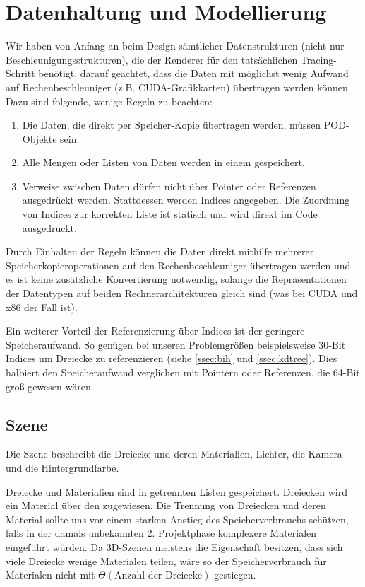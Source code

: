 \section{Datenhaltung und Modellierung}

Wir haben von Anfang an beim Design sämtlicher Datenstrukturen (nicht nur Beschleunigungsstrukturen), die der Renderer für den tatsächlichen Tracing-Schritt benötigt, darauf geachtet, dass die Daten mit möglichst wenig Aufwand auf Rechenbeschleuniger (z.B. CUDA-Grafikkarten) übertragen werden können. Dazu sind folgende, wenige Regeln zu beachten:

\begin{enumerate}
\item Die Daten, die direkt per Speicher-Kopie übertragen werden, müssen POD-Objekte sein.
\item Alle Mengen oder Listen von Daten werden in einem  gespeichert.
\item Verweise zwischen Daten dürfen nicht über Pointer oder Referenzen ausgedrückt werden. Stattdessen werden Indices angegeben. Die Zuordnung von Indices zur korrekten Liste ist statisch und wird direkt im Code ausgedrückt.
\end{enumerate}

Durch Einhalten der Regeln können die Daten direkt mithilfe mehrerer Speicherkopieroperationen auf den Rechenbeschleuniger übertragen werden und es ist keine zusätzliche Konvertierung notwendig, solange die Repräsentationen der Datentypen auf beiden Rechnerarchitekturen gleich sind (was bei CUDA und x86 der Fall ist).

Ein weiterer Vorteil der Referenzierung über Indices ist der geringere Speicheraufwand. So genügen bei unseren Problemgrößen beispielsweise 30-Bit Indices um Dreiecke zu referenzieren (siehe \ref{ssec:bih} und \ref{ssec:kdtree}). Dies halbiert den Speicheraufwand verglichen mit Pointern oder Referenzen, die 64-Bit groß gewesen wären.

\subsection{Szene}

Die Szene beschreibt die Dreiecke und deren Materialien, Lichter, die Kamera und die Hintergrundfarbe.

Dreiecke und Materialien sind in getrennten Listen gespeichert. Dreiecken wird ein Material über den  zugewiesen. Die Trennung von Dreiecken und deren Material sollte uns vor einem starken Anstieg des Speicherverbrauchs schützen, falls in der damals unbekannten 2. Projektphase komplexere Materialen eingeführt würden. Da 3D-Szenen meistens die Eigenschaft besitzen, dass sich viele Dreiecke wenige Materialen teilen, wäre so der Speicherverbrauch für Materialen nicht mit $\Theta(\text{Anzahl der Dreiecke})$ gestiegen.

